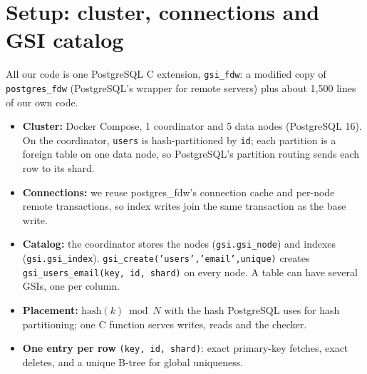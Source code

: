 \documentclass[11pt,a4paper]{article}
\begin{document}
\section{Setup: cluster, connections and GSI catalog}
All our code is one PostgreSQL C extension, \texttt{gsi\_fdw}: a modified copy of
\texttt{postgres\_fdw} (PostgreSQL's wrapper for remote servers) plus about 1,500 lines of our own code.
\begin{itemize}
  \item \textbf{Cluster:} Docker Compose, 1 coordinator and 5 data nodes (PostgreSQL 16). On the
        coordinator, \texttt{users} is hash-partitioned by \texttt{id}; each partition is a foreign
        table on one data node, so PostgreSQL's partition routing sends each row to its shard.
  \item \textbf{Connections:} we reuse postgres\_fdw's connection cache and per-node remote
        transactions, so index writes join the same transaction as the base write.
  \item \textbf{Catalog:} the coordinator stores the nodes (\texttt{gsi.gsi\_node}) and indexes
        (\texttt{gsi.gsi\_index}). \texttt{gsi\_create('users','email',unique)} creates
        \texttt{gsi\_users\_email(key, id, shard)} on every node. A table can have several GSIs,
        one per column.
  \item \textbf{Placement:} $\mathrm{hash}(k) \bmod N$ with the hash PostgreSQL uses for hash
        partitioning; one C function serves writes, reads and the checker.
  \item \textbf{One entry per row} \texttt{(key, id, shard)}: exact primary-key fetches, exact
        deletes, and a unique B-tree for global uniqueness.
\end{itemize}
\end{document}
